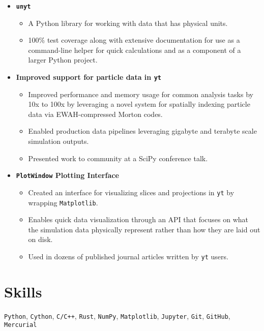 \documentclass[10pt,letterpaper]{article}
\begin{document}
\begin{itemize}

  \item[] {\bf \texttt{unyt}}
    \begin{itemize}
      \item A Python library for working with data that has physical
        units.
      \item 100\% test coverage along with extensive documentation for use as a
        command-line helper for quick calculations and as a component of a
        larger Python project.
    \end{itemize}
  \item[] {\bf Improved support for particle data in \texttt{yt}}
    \begin{itemize}
      \item Improved performance and memory usage for common analysis tasks by
        10x to 100x by leveraging a novel system for spatially indexing particle
        data via EWAH-compressed Morton codes.
      \item Enabled production data pipelines leveraging gigabyte and
        terabyte scale simulation outputs.
      \item Presented work to community at a SciPy conference talk.
    \end{itemize}
  \item[] {\bf\texttt{PlotWindow} Plotting Interface}
    \begin{itemize}
      \item Created an interface for visualizing slices and projections in
        \texttt{yt} by wrapping \texttt{Matplotlib}.
      \item Enables quick data visualization through an API that
        focuses on what the simulation data physically represent rather than how
        they are laid out on disk.
      \item Used in dozens of published journal articles
        written by \texttt{yt} users.
    \end{itemize}

\end{itemize}

\section*{Skills}

\texttt{Python}, \texttt{Cython}, \texttt{C/C++}, \texttt{Rust}, \texttt{NumPy}, \texttt{Matplotlib},
\texttt{Jupyter}, \texttt{Git}, \texttt{GitHub}, \texttt{Mercurial}
\end{document}

